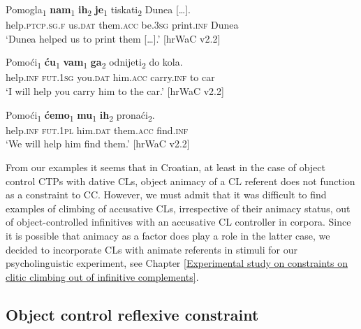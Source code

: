\begin{exe}\ex\label{(11.64)}
\gll Pomogla\textsubscript{1} \textbf{nam}\textsubscript{1} \textbf{ih}\textsubscript{2} \textbf{je}\textsubscript{1} tiskati\textsubscript{2} {Dunea [\dots].} \\
help.\textsc{ptcp}.\textsc{sg}.\textsc{f} us.\textsc{dat} them.\textsc{acc} be.3\textsc{sg} print.\textsc{inf} Dunea \\
\glt ‘Dunea helped us to print them [\dots].’
\hfill [hrWaC v2.2]

\ex\label{(11.65)}
\gll Pomoći\textsubscript{1} \textbf{ću}\textsubscript{1} \textbf{vam}\textsubscript{1} \textbf{ga}\textsubscript{2} odnijeti\textsubscript{2} do kola. \\
help.\textsc{inf} \textsc{fut}.1\textsc{sg} you.\textsc{dat} him.\textsc{acc} carry.\textsc{inf} to car \\
\glt ‘I will help you carry him to the car.’
\hfill [hrWaC v2.2]

\ex\label{(11.66)}
\gll Pomoći\textsubscript{1} \textbf{ćemo}\textsubscript{1} \textbf{mu}\textsubscript{1} \textbf{ih}\textsubscript{2} pronaći\textsubscript{2}. \\
help.\textsc{inf} \textsc{fut}.1\textsc{pl} him.\textsc{dat} them.\textsc{acc} find.\textsc{inf} \\
\glt ‘We will help him find them.’
\hfill [hrWaC v2.2]
\end{exe}

\noindent From our examples it seems that in Croatian, at least in the case of object control CTPs with dative CLs, object animacy of a CL referent does not function as a constraint to CC. However, we must admit that it was difficult to find examples of climbing of accusative CLs, irrespective of their animacy status, out of object-controlled infinitives with an accusative CL controller in corpora. Since it is possible that animacy as a factor does play a role in the latter case, we decided to incorporate CLs with animate referents in stimuli for our psycholinguistic experiment, see Chapter \ref{Experimental study on constraints on clitic climbing out of infinitive complements}.

\newpage
\subsection{Object control reflexive constraint}
\label{Object control reflexive constraint}

